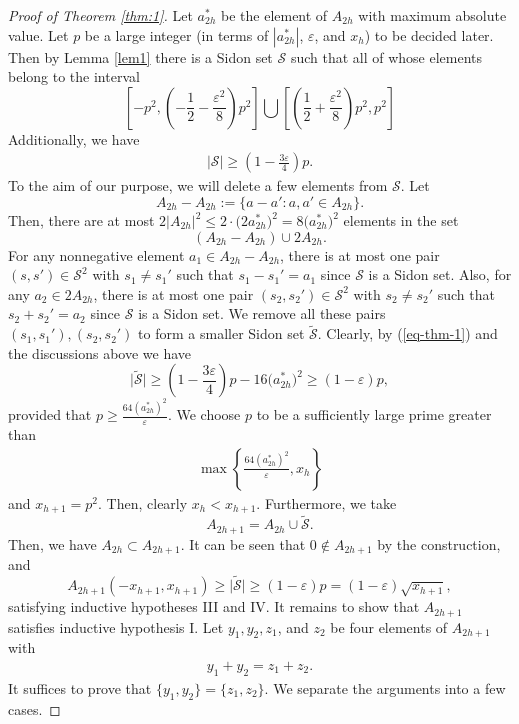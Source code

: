 \documentclass[12pt,a4paper,reqno]{amsart}
\numberwithin{equation}{section}
\theoremstyle{plain}
\theoremstyle{definition}
\begin{document}
\begin{proof}[Proof of Theorem \ref{thm:1}]
Let $a^*_{2h}$ be the element of $A_{2h}$ with maximum absolute value. Let $p$ be a large integer (in terms of $|a^*_{2h}|$, $\varepsilon$, and $x_h$) to be decided later. Then by Lemma \ref{lem1} there is a Sidon set $\mathscr{S}$ such that all of whose elements belong to the interval
$$
\left[-p^2,\left(-\frac{1}{2}-\frac{\varepsilon^2}{8}\right)p^2\right]\bigcup \left[\left(\frac{1}{2}+\frac{\varepsilon^2}{8}\right)p^2, p^2\right]
$$ 
Additionally, we have 
\begin{align}\label{eq-thm-1}
\big|\mathscr{S}\big|\ge \left(1-\frac{3\varepsilon}{4}\right)p.
\end{align}
To the aim of our purpose, we will delete a few elements from $\mathscr{S}$. Let 
$$
A_{2h}-A_{2h}:=\big\{a-a': a, a'\in A_{2h}\big\}.
$$
Then, there are at most $2|A_{2h}|^2\le 2\cdot\big(2a^*_{2h}\big)^2=8\big(a^*_{2h}\big)^2$ elements in the set 
$$
(A_{2h}-A_{2h})\cup 2A_{2h}.
$$
For any nonnegative element $a_1\in A_{2h}-A_{2h}$, there is at most one pair $(s,s')\in \mathscr{S}^2$ with $s_1\neq s_1'$ such that $s_1-s_1'=a_1$ since $\mathscr{S}$ is a Sidon set. Also, for any $a_2\in 2A_{2h}$, there is at most one pair $(s_2,s_2')\in \mathscr{S}^2$ with $s_2\neq s_2'$ such that $s_2+s_2'=a_2$ since $\mathscr{S}$ is a Sidon set.
We remove all these pairs $(s_1,s_1'), (s_2, s_2')$ to form a smaller Sidon set $\widetilde{\mathscr{S}}$. Clearly, by (\ref{eq-thm-1}) and the discussions above we have
$$
\big|\widetilde{\mathscr{S}}\big|\ge \left(1-\frac{3\varepsilon}{4}\right)p-16\big(a^*_{2h}\big)^2\ge \left(1-\varepsilon\right)p,
$$
provided that $p\ge \frac{64(a^*_{2h})^2}{\varepsilon}$. We choose $p$ to be a sufficiently large prime greater than 
\begin{align}\label{eq-thm-2}
\max\left\{\frac{64(a^*_{2h})^2}{\varepsilon}, x_h\right\}
\end{align}
and $x_{h+1}=p^2$. Then, clearly $x_{h}<x_{h+1}$. Furthermore, we take
$$
A_{2h+1}=A_{2h}\cup \widetilde{\mathscr{S}}.
$$
Then, we have $A_{2h}\subset A_{2h+1}$. It can be seen that $0\not\in A_{2h+1}$ by the construction, and
$$
A_{2h+1}(-x_{h+1},x_{h+1})\ge \big|\widetilde{\mathscr{S}}\big|\ge \left(1-\varepsilon\right)p=\left(1-\varepsilon\right)\sqrt{x_{h+1}},
$$
satisfying inductive hypotheses III and IV. It remains to show that $A_{2h+1}$ satisfies inductive hypothesis I. Let $y_1, y_2, z_1$, and $z_2$ be four elements of $A_{2h+1}$ with
\begin{align}\label{eq-thm-3}
y_1+y_2=z_1+z_2.
\end{align}
It suffices to prove that $\{y_1,y_2\}=\{z_1,z_2\}$. We separate the arguments into a few cases.


\end{proof}
\end{document}
